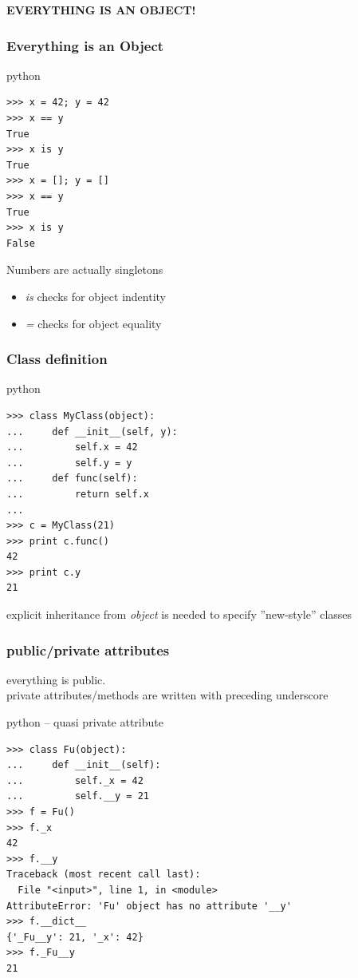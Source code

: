 \documentclass{beamer}
\begin{document}
\begin{frame}[plain]
	\begin{center}
	\huge{\textbf{EVERYTHING IS AN OBJECT!}}
	\end{center}
\end{frame}

\begin{frame}[fragile]
	\frametitle{Everything is an Object}
	\begin{exampleblock}{python}
	\begin{lstlisting}
>>> x = 42; y = 42
>>> x == y
True
>>> x is y
True
>>> x = []; y = []
>>> x == y
True
>>> x is y
False
	\end{lstlisting}
	\end{exampleblock}
	Numbers are actually singletons\\
	\begin{itemize}
		\item \emph{is} checks for object indentity
		\item \emph{=} checks for object equality
	\end{itemize}
\end{frame}

\begin{frame}[fragile]
	\frametitle{Class definition}
	\begin{exampleblock}{python}
	\begin{lstlisting}
>>> class MyClass(object):
...     def __init__(self, y):
...         self.x = 42
...         self.y = y
...     def func(self):
...         return self.x
... 
>>> c = MyClass(21)
>>> print c.func()
42
>>> print c.y
21
	\end{lstlisting}
	\end{exampleblock}
	
	explicit inheritance from \emph{object} is needed to specify ''new-style'' classes
\end{frame}

\begin{frame}[fragile]
	\frametitle{public/private attributes}
	everything is public.\\
	private attributes/methods are written with preceding underscore
	\begin{exampleblock}{python -- quasi private attribute}
	\begin{lstlisting}
>>> class Fu(object):
...     def __init__(self):
...         self._x = 42
...         self.__y = 21
>>> f = Fu()
>>> f._x
42
>>> f.__y
Traceback (most recent call last):
  File "<input>", line 1, in <module>
AttributeError: 'Fu' object has no attribute '__y'
>>> f.__dict__
{'_Fu__y': 21, '_x': 42}
>>> f._Fu__y
21
	\end{lstlisting}
	\end{exampleblock}
\end{frame}
\end{document}

